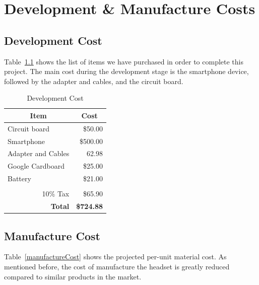 \chapter{Development \& Manufacture Costs}

\section{Development Cost}
Table~\ref{developmentCost} shows the list of items we have purchased in order to complete this project. The main cost during the development stage is the smartphone device, followed by the adapter and cables, and the circuit board.

\begin{table}[]
\centering
\caption{Development Cost}
\label{developmentCost}
\begin{tabular}{|l|r|}
\hline
\multicolumn{1}{|c|}{\textbf{Item}}  & \multicolumn{1}{c|}{\textbf{Cost}} \\ \hline
Circuit board                        & \$50.00                            \\ \hline
Smartphone                           & \$500.00                           \\ \hline
Adapter and Cables                   & 62.98                              \\ \hline
Google Cardboard                     & \$25.00                            \\ \hline
Battery                              & \$21.00                            \\ \hline
                                     &                                    \\ \hline
\multicolumn{1}{|r|}{10\% Tax}       & \$65.90                            \\ \hline
\multicolumn{1}{|r|}{\textbf{Total}} & \textbf{\$724.88}                  \\ \hline
\end{tabular}
\end{table}

\pagebreak

\section{Manufacture Cost}

Table~\ref{manufactureCost} shows the projected per-unit material cost. As mentioned before, the cost of manufacture the headset is greatly reduced compared to similar products in the market.

